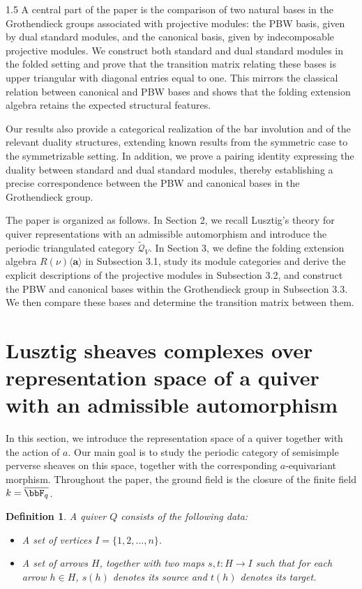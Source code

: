 \documentclass[10pt]{amsart}
\newtheorem{definition}[theorem]{Definition}
\begin{document}
\begin{spacing}{1.5}
A central part of the paper is the comparison of two natural bases in the Grothendieck groups associated with projective modules: the PBW basis, given by dual standard modules, and the canonical basis, given by indecomposable projective modules. We construct both standard and dual standard modules in the folded setting and prove that the transition matrix relating these bases is upper triangular with diagonal entries equal to one. This mirrors the classical relation between canonical and PBW bases and shows that the folding extension algebra retains the expected structural features.

Our results also provide a categorical realization of the bar involution and of the relevant duality structures, extending known results from the symmetric case to the symmetrizable setting. In addition, we prove a pairing identity expressing the duality between standard and dual standard modules, thereby establishing a precise correspondence between the PBW and canonical bases in the Grothendieck group.

The paper is organized as follows. In Section 2, we recall Lusztig's theory for quiver representations with an admissible automorphism and introduce the periodic triangulated category $\widetilde{\mathcal{Q}}_V$. In Section 3, we define the folding extension algebra $R(\nu)\langle\mathbf{a}\rangle$ in Subsection 3.1, study its module categories and derive the explicit descriptions of the projective modules in Subsection 3.2, and construct the PBW and canonical bases within the Grothendieck group in Subsection 3.3. We then compare these bases and determine the transition matrix between them.

\section{Lusztig sheaves complexes over representation space of a quiver with an admissible automorphism}
In this section, we introduce the representation space of a quiver together with the action of $a$. Our main goal is to study the periodic category of semisimple perverse sheaves on this space, together with the corresponding $a$-equivariant morphism. Throughout the paper, the ground field is the closure of the finite field $k=\overline{\bbF_q}$.

\begin{definition}
A quiver $Q$ consists of the following data:
\begin{itemize}
    \item A set of vertices $I = \{1,2,\ldots,n\}$.
    \item A set of arrows $H$, together with two maps $s, t : H \to I$ such that for each arrow $h \in H$, $s(h)$ denotes its source and $t(h)$ denotes its target.
\end{itemize}
\end{definition}


\end{spacing}
\end{document}
